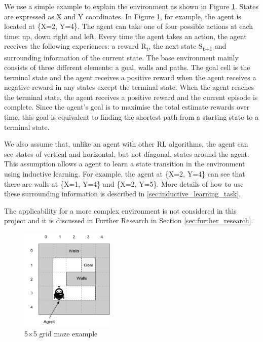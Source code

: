 We use a simple example to explain the environment as shown in Figure \ref{environment_example}.
States are expressed as X and Y coordinates. In Figure \ref{environment_example}, for example, the agent is located at \{X=2, Y=4\}.
The agent can take one of four possible actions at each time: up, down right and left.
Every time the agent takes an action, the agent receives the following experiences: a reward R\textsubscript{t}, the next state S\textsubscript{t+1} and surrounding information of the current state.
The base environment mainly consists of three different elements: a goal, walls and paths.
The goal cell is the terminal state and the agent receives a positive reward when the agent receives a negative reward in any states except the terminal state.
When the agent reaches the terminal state, the agent receives a positive reward and the current episode is complete. 
Since the agent's goal is to maximise the total estimate rewards over time, this goal is equivalent to finding the shortest path from a starting state to a terminal state.

We also assume that, unlike an agent with other RL algorithms, the agent can see states of vertical and horizontal, but not diagonal, states around the agent. 
This assumption allows a agent to learn a state transition in the environment using inductive learning. For example, the agent at \{X=2, Y=4\} can see that there are walls at \{X=1, Y=4\} and \{X=2, Y=5\}.
More details of how to use these surrounding information is described in \ref{sec:inductive_learning_task}.

The applicability for a more complex environment is not considered in this project and it is discussed in Further Research in Section \ref{sec:further_research}.

\begin{figure}[!htb]
\centering
\includegraphics[width=0.4\textwidth]{./figures/environment_example}
\caption{5$\times$5 grid maze example}
\label{environment_example}
\end{figure}

